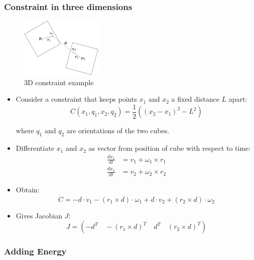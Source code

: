 \documentclass[a4paper]{article}
\begin{document}
\subsubsection{Constraint in three dimensions}

\begin{figure}[h!]
  \centering
  \includegraphics[width=0.35\textwidth]{graphics/constraint_3d_example.eps}
  \caption{3D constraint example}
  \label{fig:constraint_3d_example}
\end{figure}
\FloatBarrier

\begin{itemize}
  \item
    Consider a constraint that keeps points $x_{1}$ and $x_{2}$ a fixed distance
    $L$ apart:
    \[
      C(x_{1}, q_{1}, x_{2}, q_{2}) =
        \frac{1}{2} \left((x_{2} - x_{1})^{2} - L^{2}\right)
    \]

    where $q_{1}$ and $q_{2}$ are orientations of the two cubes.

  \item
    Differentiate $x_{1}$ and $x_{2}$ as vector from position of cube with
    respect to time:
    \begin{align*}
      \frac{dx_{1}}{dt} &= v_{1} + \omega_{1} \times r_{1} \\
      \frac{dx_{2}}{dt} &= v_{2} + \omega_{2} \times r_{2}
    \end{align*}

  \item
    Obtain:
    \[
      \dot C = -d \cdot v_{1} - (r_{1} \times d) \cdot \omega_{1} +
                d \cdot v_{2} + (r_{2} \times d) \cdot \omega_{2}
    \]

  \item
    Gives Jacobian $J$:
    \[
      J = (-d^{T} \quad -(r_{1} \times d)^{T} \quad d^{T} \quad (r_{2} \times d)^{T})
    \]

\end{itemize}

\subsubsection{Adding Energy}
\end{document}
